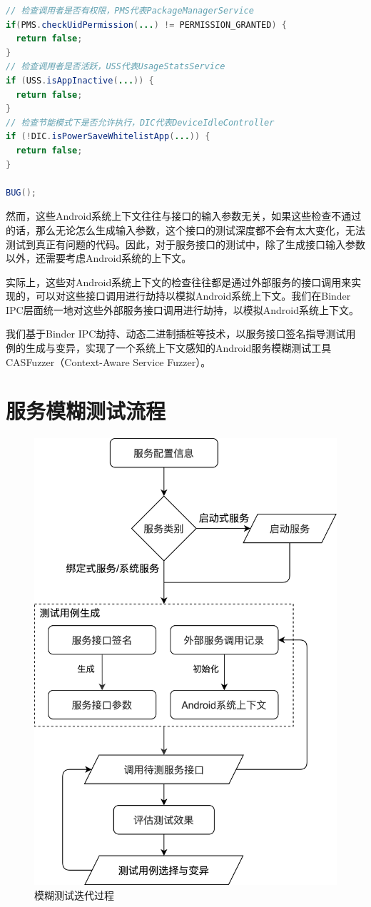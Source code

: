 \documentclass[winfonts,master,twoside]{njuthesis}
\begin{document}
\begin{lstlisting}[caption={服务实现中对Android系统上下文的检查},label={lst:service_api_impl_example},language=java,basicstyle=\footnotesize]
// 检查调用者是否有权限，PMS代表PackageManagerService
if(PMS.checkUidPermission(...) != PERMISSION_GRANTED) {
  return false;
}
// 检查调用者是否活跃，USS代表UsageStatsService
if (USS.isAppInactive(...)) {
  return false;
}
// 检查节能模式下是否允许执行，DIC代表DeviceIdleController
if (!DIC.isPowerSaveWhitelistApp(...)) {
  return false;
}

BUG();
\end{lstlisting}

然而，这些Android系统上下文往往与接口的输入参数无关，如果这些检查不通过的话，那么无论怎么生成输入参数，这个接口的测试深度都不会有太大变化，无法测试到真正有问题的代码。因此，对于服务接口的测试中，除了生成接口输入参数以外，还需要考虑Android系统的上下文。

实际上，这些对Android系统上下文的检查往往都是通过外部服务的接口调用来实现的，可以对这些接口调用进行劫持以模拟Android系统上下文。我们在Binder IPC层面统一地对这些外部服务接口调用进行劫持，以模拟Android系统上下文。

我们基于Binder IPC劫持、动态二进制插桩等技术，以服务接口签名指导测试用例的生成与变异，实现了一个系统上下文感知的Android服务模糊测试工具CASFuzzer（Context-Aware Service Fuzzer）。


\section{服务模糊测试流程}


\begin{figure}
	\centering
	\includegraphics[width=.7\textwidth]{figure/4-fuzzer/workflow.png}
	\caption{模糊测试迭代过程}
	\label{workflow}
\end{figure}
\end{document}
